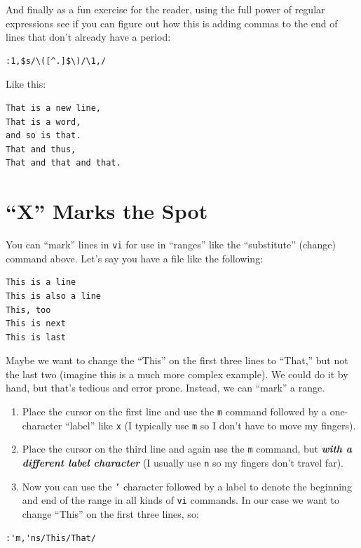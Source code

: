 \documentclass[10pt,]{book}
\numberwithin{figure}{chapter}
\begin{document}
And finally as a fun exercise for the reader, using the full power of
regular expressions see if you can figure out how this is adding commas
to the end of lines that don't already have a period:

\begin{verbatim}
:1,$s/\([^.]$\)/\1,/
\end{verbatim}

Like this:

\begin{verbatim}
That is a new line,
That is a word,
and so is that.
That and thus,
That and that and that.
\end{verbatim}

\section{``X'' Marks the Spot}\label{x-marks-the-spot}

You can ``mark'' lines in \texttt{vi} for use in ``ranges'' like the
``substitute'' (change) command above. Let's say you have a file like
the following:

\begin{verbatim}
This is a line
This is also a line
This, too
This is next
This is last
\end{verbatim}

Maybe we want to change the ``This'' on the first three lines to
``That,'' but not the last two (imagine this is a much more complex
example). We could do it by hand, but that's tedious and error prone.
Instead, we can ``mark'' a range.

\begin{enumerate}
\def\labelenumi{\arabic{enumi}.}
\item
  Place the cursor on the first line and use the \texttt{m} command
  followed by a one-character ``label'' like \texttt{x} (I typically use
  \texttt{m} so I don't have to move my fingers).
\item
  Place the cursor on the third line and again use the \texttt{m}
  command, but \textbf{\emph{with a different label character}} (I
  usually use \texttt{n} so my fingers don't travel far).
\item
  Now you can use the \texttt{'} character followed by a label to denote
  the beginning and end of the range in all kinds of \texttt{vi}
  commands. In our case we want to change ``This'' on the first three
  lines, so:
\end{enumerate}

\begin{verbatim}
:'m,'ns/This/That/
\end{verbatim}
\end{document}
